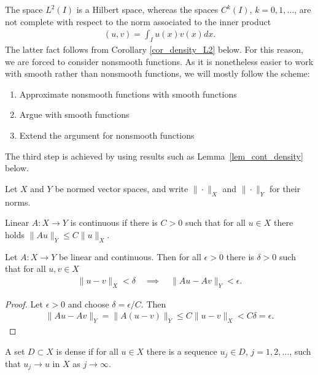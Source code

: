 \documentclass[12pt,oneside]{amsart}
\begin{document}
The space $L^2(I)$ is a Hilbert space, whereas 
the spaces $C^k(I)$, $k=0,1,\dots$, are not complete with respect to the norm associated to the inner product
    \begin{align*}
(u,v) = \int_I u(x)v(x)dx.
    \end{align*}
The latter fact follows from Corollary \ref{cor_density_L2} below.
For this reason, we are forced to consider nonsmooth functions.
As it is nonetheless easier to work with smooth rather than nonsmooth functions, we will mostly follow the scheme:
\begin{enumerate}[1. ]
\item Approximate nonsmooth functions with smooth functions
\item Argue with smooth functions
\item Extend the argument for nonsmooth functions 
\end{enumerate}
The third step is achieved by using results such as Lemma~\ref{lem_cont_density} below.

Let $X$ and $Y$ be normed vector spaces, and write $\|\cdot\|_X$ and $\|\cdot\|_Y$ for their norms.   

\begin{definition}\label{def_cont}
Linear $A : X \to Y$ is continuous if there is $C > 0$
such that for all $u \in X$ there holds 
$\|A u\|_Y \le C \|u\|_X$.
\end{definition}

\begin{remark}
Let $A : X \to Y$ be linear and continuous.
Then for all $\epsilon > 0$ there is $\delta > 0$ 
such that for all $u, v \in X$ 
    \begin{align*}
\|u-v\|_X < \delta \quad \implies \quad \|Au-Av\|_Y < \epsilon.
    \end{align*}
\end{remark}
\begin{proof}
Let $\epsilon > 0$ and choose $\delta = \epsilon / C$. 
Then
    \begin{align*}
\|Au-Av\|_Y = \|A(u-v)\|_Y \le C \|u-v\|_X < C \delta = \epsilon.
    \end{align*}
\end{proof}

\begin{definition}
A set $D \subset X$ is dense if for all $u \in X$ there is a sequence $u_j \in D$, $j=1,2,\dots$, such that $u_j \to u$ in $X$ as $j \to \infty$.
\end{definition}
\end{document}
